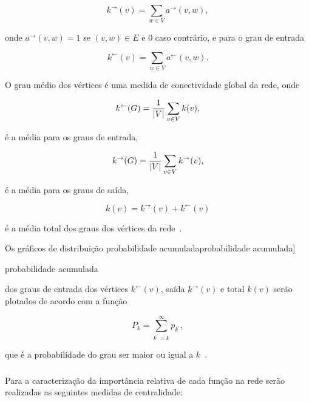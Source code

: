\documentclass[a4paper,12pt,twoside]{article}
\def\degreelabel{k}
\def\degree#1{\degreelabel(#1)}
\def\degreein#1{\degreelabel^\leftarrow(#1)}
\def\degreeout#1{\degreelabel^\rightarrow(#1)}
\renewcommand\marginpar[1]{}
\let\oldmarginpar\marginpar
\renewcommand\marginpar[1]{\-\oldmarginpar[\raggedleft\footnotesize #1]%
{\raggedright\footnotesize #1}}
\begin{document}
\begin{displaymath}
  \label{eq:k}
  \degreeout{v} = \sum_{w \in V} {a^\rightarrow(v,w)},
\end{displaymath}


\noindent onde ${a^\rightarrow(v,w)} = 1$ se $(v,w) \in E$ e $0$ caso contrário, 
 e para o grau de entrada

\begin{displaymath}
  \label{eq:kin}
    \degreein{v} = \sum_{w\in V} a^\leftarrow(v,w).
\end{displaymath}

O grau médio dos vértices é uma medida de conectividade global da
rede, onde

\begin{displaymath}
  \label{eq:avgin}
    \degreein{G} =  {1 \over |V|} \sum_{v\in V}\degree{v},
\end{displaymath}

\noindent é a média para os graus de entrada,

\begin{displaymath}
  \label{eq:avgout}
   \degreeout{G} =  {1 \over |V|} \sum_{v\in V}\degreeout{v},
\end{displaymath}

\noindent é a média para os graus de saída,

\begin{equation}
  \label{eq:avg}
   \degree{v} =  \degreeout{v}  + \degreein{v} 
\end{equation}

\noindent é a média total dos graus dos vértices da rede~\cite{costa-2007}.

Os gráficos de distribuição probabilidade
acumulada\marginpar{probabilidade acumulada} dos graus de entrada dos
vértices $\degreein{v}$, saída $\degreeout{v}$ e total $\degree{v}$
serão plotados de acordo com a função

\begin{equation}
  \label{eq:prob}
  P_k=\sum_{k^\prime=k}^{\infty}p_{k^\prime},
\end{equation}

\noindent que é a probabilidade do grau ser maior ou igual a
$k$~\cite{newman-2003-45}.

\subsubsection{\centr}
\label{s:centralidade}

Para a caracterização da importância relativa de cada função na rede
 serão realizadas as seguintes medidas de centralidade:
\end{document}
